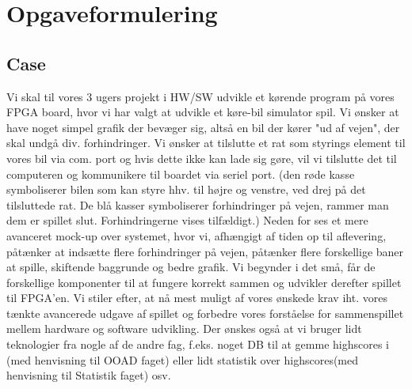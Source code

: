 \chapter{Opgaveformulering}\label{cha:opgaveformulering}
\section{Case}
Vi skal til vores 3 ugers projekt i HW/SW udvikle et kørende program på vores FPGA board, hvor vi har valgt at udvikle et køre-bil simulator spil. Vi ønsker at have noget simpel grafik der bevæger sig, altså en bil der kører "ud af vejen", der skal undgå div. forhindringer. Vi ønsker at tilslutte et rat som styrings element til vores bil via com. port og hvis dette ikke kan lade sig gøre, vil vi tilslutte det til computeren og kommunikere til boardet via seriel port.
(den røde kasse symboliserer bilen som kan styre hhv. til højre og venstre, ved drej på det tilsluttede rat. De blå kasser symboliserer forhindringer på vejen, rammer man dem er spillet slut. Forhindringerne vises tilfældigt.)
Neden for ses et mere avanceret mock-up over systemet, hvor vi, afhængigt af tiden op til aflevering, påtænker at indsætte flere forhindringer på vejen, påtænker flere forskellige baner at spille, skiftende baggrunde og bedre grafik. Vi begynder i det små, får de forskellige komponenter til at fungere korrekt sammen og udvikler derefter spillet til FPGA'en. Vi stiler efter, at nå mest muligt af vores ønskede krav iht. vores tænkte avancerede udgave af spillet og forbedre vores forståelse for sammenspillet mellem hardware og software udvikling. Der ønskes også at vi bruger lidt teknologier fra nogle af de andre fag, f.eks. noget DB til at gemme highscores i (med henvisning til OOAD faget) eller lidt statistik over highscores(med henvisning til Statistik faget) osv.
